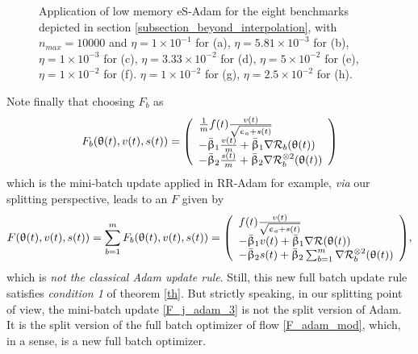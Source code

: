 \documentclass[article,authoryear,jmlmc]{beg_32}             %
\begin{document}
\begin{figure}[h!]
	\centering
	\scalebox{0.60}{}
        \caption{
          Application of low memory eS-Adam for the eight benchmarks depicted in section \ref{subsection_beyond_interpolation}, with $n_{max}=10000$ and
 $\eta = 1   \times 10^{-1}$  for \exOne    (a),
 $\eta = 5.81\times 10^{-3}$  for \exTwo    (b),
 $\eta = 1   \times 10^{-3}$  for \exThree  (c),
 $\eta = 3.33\times 10^{-2}$  for \exFour   (d),
 $\eta = 5   \times 10^{-2}$  for \exFive   (e),
 $\eta = 1   \times 10^{-2}$  for \exSix    (f).
 $\eta = 1   \times 10^{-2}$  for \exSeven  (g),
 $\eta = 2.5 \times 10^{-2}$  for \exHeight (h).
}
	\label{speth_adam_exs}
\end{figure}


Note finally that choosing $F_b$ as
\begin{eqnarray}
\label{F_j_adam_3}
F_b(\theta(t),v(t),s(t))=\left(\begin{array}{l}
  \frac{1}{m}f(t) \frac{v(t)}{\sqrt{\epsilon_a+s(t)}}\\
     -\bar{\beta}_1 \frac{v(t)}{m}+\bar{\beta}_1\nR_b(\theta(t))\\
     -\bar{\beta}_2 \frac{s(t)}{m}+\bar{\beta}_2\nR_b^{\otimes 2}(\theta(t))\\
  \end{array}\right)
\end{eqnarray}
which is the mini-batch update applied in RR-Adam for example, {\em via} our splitting perspective, 
leads to an $F$ given by 
\begin{eqnarray}
\label{F_adam_mod}
  F(\theta(t),v(t),s(t))=\sum_{b=1}^m F_b(\theta(t),v(t),s(t))=\left(\begin{array}{l}
  f(t) \frac{v(t)}{\sqrt{\epsilon_a+s(t)}}\\
     -\bar{\beta}_1 {v(t)}+\bar{\beta}_1\nR(\theta(t))\\
     -\bar{\beta}_2 {s(t)}+\bar{\beta}_2\sum_{b=1}^m \nR_b^{\otimes 2}(\theta(t))\\
  \end{array}\right),
\end{eqnarray}
which is {\em not the classical Adam update rule}. Still, this new full batch update rule satisfies
{\em condition 1} of theorem \ref{th}. But strictly speaking, in our splitting point of view, the mini-batch update \eqref{F_j_adam_3} is not the split version of Adam. 
It is the split version of the full batch optimizer of flow \eqref{F_adam_mod}, which, in a sense, is a new full batch optimizer.  
\end{document}
